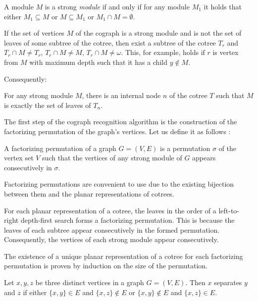 \begin{definition} 
A module $M$ is a strong \emph{module} if and only if for any module $M_1$ it holds that either $ M_1 \subseteq M$ or $ M \subseteq M_1$ or $M_1 \cap M = \emptyset$.
\end{definition}

If the set of vertices $M$ of the cograph is a strong module and is not the set of leaves of some subtree of the cotree, then exist a subtree of the cotree $T_r$ and $T_r \cap M \neq T_r$, $T_r \cap M \neq M$, $T_r \cap M \neq \omega$. This, for example, holds if $r$ is vertex from $M$ with maximum depth such that it has a child $y \notin M$.

Consequently:
\begin{remark} 
    For any strong module $M$, there is an internal node $n$ of the cotree $T$ such that $M$ is exactly the set of leaves of $T_n$.
\end{remark}

The first step of the cograph recognition algorithm is the construction of the factorizing permutation of the graph's vertices. Let us define it as follows :

\begin{definition}
    A factorizing permutation of a graph $G =(V,E)$ is a permutation $\sigma$ of the vertex set $V$ such that the vertices of any strong module of $G$ appears consecutively in $\sigma$.
\end{definition}

Factorizing permutations are convenient to use due to the existing bijection between them and the planar representations of cotrees.

\begin{theorem}
    For each planar representation of a cotree, the leaves in the order of a left-to-right depth-first search forms a factorizing permutation. This is because the leaves of each subtree appear consecutively in the formed permutation. Consequently, the vertices of each strong module appear consecutively.

The existence of a unique planar representation of a cotree for each factorizing permutation is proven by induction on the size of the permutation.
\end{theorem}

\begin{definition}
    Let $x, y, z$ be three distinct vertices in a graph $G=(V,E)$. Then $x$ separates $y$ and $z$ if either $\{x,y\} \in E $ and $\{x,z\} \notin E$ or $\{x,y\} \notin E $ and $\{x,z\} \in E$.
\end{definition}


